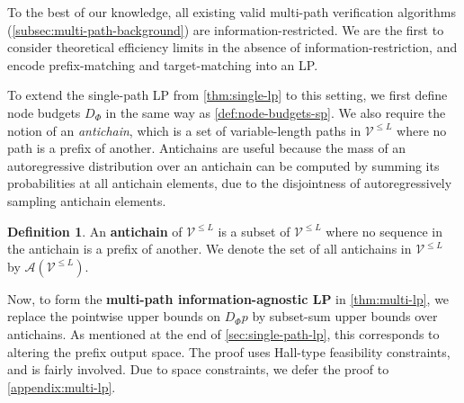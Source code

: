 \documentclass{article}
\theoremstyle{plain}
\theoremstyle{definition}
\newtheorem{definition}[theorem]{Definition}
\theoremstyle{remark}
\newcommand{\V}{\mathcal{V}}
\begin{document}
To the best of our knowledge, all existing valid multi-path verification algorithms (\cref{subsec:multi-path-background}) are information-restricted. We are the first to consider theoretical efficiency limits in the absence of information-restriction, and encode prefix-matching and target-matching into an LP.

To extend the single-path LP from \cref{thm:single-lp} to this setting, we first define node budgets $D_\Phi$ in the same way as \cref{def:node-budgets-sp}. We also require the notion of an \emph{antichain}, which is a set of variable-length paths in $\V^{\leq L}$ where no path is a prefix of another. Antichains are useful because the mass of an autoregressive distribution over an antichain can be computed by summing its probabilities at all antichain elements, due to the disjointness of autoregressively sampling antichain elements.

\begin{definition}
    An \textbf{antichain} of $\V^{\leq L}$ is a subset of $\V^{\leq L}$ where no sequence in the antichain is a prefix of another. We denote the set of all antichains in $\V^{\leq L}$ by $\mathcal{A}(\V^{\leq L})$.
    \label{def:antichain}
\end{definition}

Now, to form the \textbf{multi-path information-agnostic LP} in \cref{thm:multi-lp}, we replace the pointwise upper bounds on $D_\Phi p$ by subset-sum upper bounds over antichains. As mentioned at the end of \cref{sec:single-path-lp}, this corresponds to altering the prefix output space. The proof uses Hall-type feasibility constraints, and is fairly involved. Due to space constraints, we defer the proof to \cref{appendix:multi-lp}.
\end{document}
